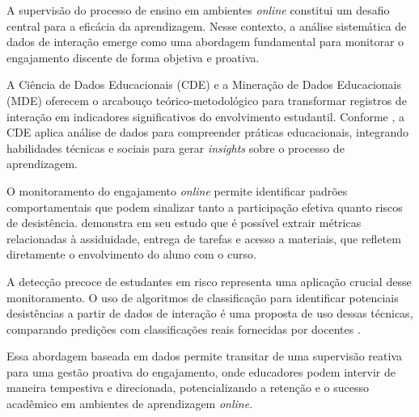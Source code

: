 A supervisão do processo de ensino em ambientes \textit{online} constitui um desafio central para a eficácia da aprendizagem. Nesse contexto, a análise sistemática de dados de interação emerge como uma abordagem fundamental para monitorar o engajamento discente de forma objetiva e proativa.

A Ciência de Dados Educacionais (CDE) e a Mineração de Dados Educacionais (MDE) oferecem o arcabouço teórico-metodológico para transformar registros de interação em indicadores significativos do envolvimento estudantil. Conforme , a CDE aplica análise de dados para compreender práticas educacionais, integrando habilidades técnicas e sociais para gerar \textit{insights} sobre o processo de aprendizagem.

O monitoramento do engajamento \textit{online} permite identificar padrões comportamentais que podem sinalizar tanto a participação efetiva quanto riscos de desistência.  demonstra em seu estudo que é possível extrair métricas relacionadas à assiduidade, entrega de tarefas e acesso a materiais, que refletem diretamente o envolvimento do aluno com o curso.

A detecção precoce de estudantes em risco representa uma aplicação crucial desse monitoramento. O uso de algoritmos de classificação para identificar potenciais desistências a partir de dados de interação é uma proposta de uso dessas técnicas, comparando predições com classificações reais fornecidas por docentes \cite{souzaDeteccaoDesistenciaEstudantes2024}.

Essa abordagem baseada em dados permite transitar de uma supervisão reativa para uma gestão proativa do engajamento, onde educadores podem intervir de maneira tempestiva e direcionada, potencializando a retenção e o sucesso acadêmico em ambientes de aprendizagem \textit{online}.